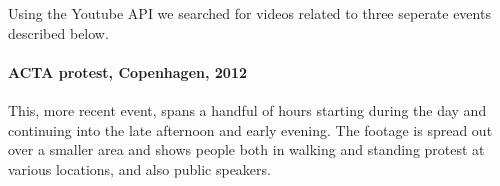 %
Using the Youtube API we searched for videos related to three seperate events described below.%
%
\paragraph{ACTA protest, Copenhagen, 2012}
%
This, more recent event, spans a handful of hours starting during the day and continuing into the late afternoon and early evening. The footage is spread out over a smaller area and shows people both in walking and standing protest at various locations, and also public speakers.
%
